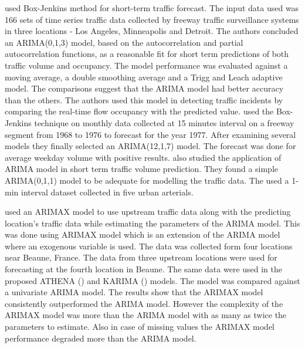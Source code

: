 \citet{ahmed1979analysis} used Box-Jenkins method for short-term traffic forecast. The input data
used was 166 sets of time series traffic data collected by freeway traffic surveillance systems in
three locations - Los Angeles, Minneapolis and Detroit. The authors concluded an ARIMA(0,1,3)
model, based on the autocorrelation and partial autocorrelation functions, as a reasonable fit for
short term predictions of both traffic volume and occupancy. The model performance was
evaluated against a moving average, a double smoothing average and a Trigg and Leach adaptive
model. The comparisons suggest that the ARIMA model had better accuracy than the others. The
authors used this model in detecting traffic incidents by comparing the real-time flow occupancy
with the predicted value. \citet{nihan1980use} used the Box-Jenkins technique on monthly data
collected at 15 minutes interval on a freeway segment from 1968 to 1976 to forecast for the year
1977. After examining several models they finally selected an ARIMA(12,1,7) model. The forecast
was done for average weekday volume with positive results. \citet{hamed1995short} also studied the
application of ARIMA model in short term traffic volume prediction. They found a simple ARIMA(0,1,1)
model to be adequate for modelling the traffic data. The used a 1-min interval dataset collected in
five urban arterials.

\citet{williams2001multivariate} used an ARIMAX model to use upstream traffic data along with the
predicting location's traffic data while estimating the parameters of the ARIMA model. This was
done using ARIMAX model which is an extension of the ARIMA model where an exogenous variable is
used. The data was collected form four locations near Beaune, France. The data from three upstream
locations were used for forecasting at the fourth location in Beaune. The same data were used
in the proposed ATHENA (\citet{danech1991athena}) and KARIMA (\citet{van1996combining}) models.
The model was compared  against a univariate ARIMA model. The results show that
the ARIMAX model consistently outperformed the ARIMA model. However the complexity of the ARIMAX
model was more than the ARIMA model with as many as twice the parameters to estimate. Also in case
of missing values the ARIMAX model performance degraded more than the ARIMA model.

